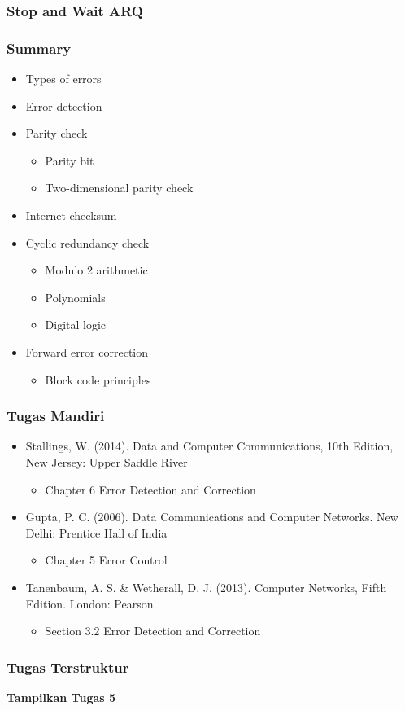 \documentclass[pdflatex,compress]{beamer}
\begin{document}
\begin{frame}
	\frametitle{Stop and Wait ARQ}
	
\end{frame}

\begin{frame}
	\frametitle{Summary}
	\begin{multicols}{2}
	\begin{itemize}
		\item Types of errors
		\item Error detection
		\item Parity check
		\begin{itemize}
			\item Parity bit
			\item Two-dimensional parity check
		\end{itemize}
		\item Internet checksum
		\item Cyclic redundancy check
		\begin{itemize}
			\item Modulo 2 arithmetic
			\item Polynomials
			\item Digital logic
		\end{itemize}
		\item Forward error correction
		\begin{itemize}
			\item Block code principles
		\end{itemize}
	\end{itemize}
	\end{multicols}
\end{frame}

\begin{frame}
	\frametitle{Tugas Mandiri}
	\begin{itemize}
		\item Stallings, W. (2014). Data and Computer Communications, 10th Edition, New Jersey: Upper Saddle River
		\begin{itemize}
			\item Chapter 6 Error Detection and Correction
		\end{itemize}
		\item Gupta, P. C. (2006). Data Communications and Computer Networks. New Delhi: Prentice Hall of India
		\begin{itemize}
			\item Chapter 5 Error Control
		\end{itemize}
		\item Tanenbaum, A. S. \& Wetherall, D. J. (2013). Computer Networks, Fifth Edition. London: Pearson.
		\begin{itemize}
			\item Section 3.2 Error Detection and Correction
		\end{itemize}
	\end{itemize}
\end{frame}

\begin{frame}
	\frametitle{Tugas Terstruktur}
	\textbf{Tampilkan Tugas 5}
\end{frame}
\end{document}
